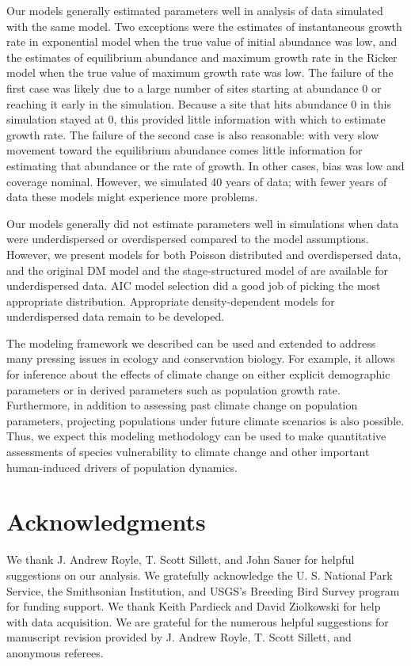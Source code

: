 \documentclass[12pt,english]{article}
\begin{document}
\begin{spacing}{1.9}
\begin{flushleft}
Our models generally estimated parameters well in analysis of data simulated with the same model.
Two exceptions were the estimates of instantaneous growth rate in exponential model when the 
true value of initial abundance was low, and the estimates of equilibrium abundance and maximum
growth rate in the Ricker model when the true value of maximum growth rate was low.  
The failure of the first case was likely due to a large number of sites starting at abundance 0 or reaching it early in the simulation.  
Because a site that hits abundance 0 in this simulation stayed at 0, this provided little information with
which to estimate growth rate.  The failure of the second case is also reasonable: with very
slow movement toward the equilibrium abundance comes little information for estimating
that abundance or the rate of growth.  In other cases, bias was low and coverage nominal.
However, we simulated 40 years of data; with fewer years of data these models might
experience more problems.

Our models generally did not estimate parameters well in simulations when data were underdispersed
or overdispersed compared to the model assumptions.  However, we present models for
both Poisson distributed and overdispersed data, and the original DM model and the 
stage-structured model of \citet{zipkin_etal:2014} are available for underdispersed data.  AIC model
selection did a good job of picking the most appropriate distribution.  Appropriate 
density-dependent models for underdispersed data remain to be developed.

The modeling framework we described can be used and extended to address many
pressing issues in ecology and conservation biology. For
example,
it allows for inference 
about the effects of climate change on either explicit
demographic parameters or in derived parameters such as
population growth rate. Furthermore, 
in addition to assessing past climate change on population
parameters, projecting populations under future climate scenarios is also
possible. Thus, we expect this modeling methodology can be used
to make quantitative assessments of species vulnerability to climate
change and other important human-induced drivers of population
dynamics.


\section*{Acknowledgments}

We thank J. Andrew Royle, T. Scott Sillett, and John Sauer for helpful suggestions on our analysis. 
We gratefully acknowledge the U. S. National Park 
Service, the Smithsonian Institution, and USGS's Breeding Bird Survey program for funding support.
We thank Keith Pardieck and David Ziolkowski for help with data acquisition. We are
grateful for the numerous helpful suggestions for manuscript
revision provided by J. Andrew Royle, T. Scott Sillett, and anonymous referees.


\end{flushleft}
\end{spacing}
\end{document}
